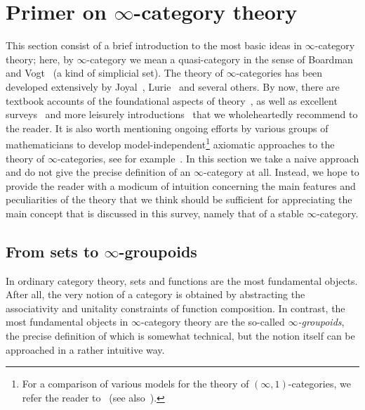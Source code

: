 \documentclass[a4paper]{amsart}
\begin{document}
\section{Primer on $\infty$-category theory}
\label{sec:primer}

This section consist of a brief introduction to the most basic ideas in
$\infty$-category theory; here, by $\infty$-category we mean a quasi-category in
the sense of Boardman and Vogt~\cite{BV73} (a kind of simplicial set). The
theory of $\infty$-categories has been developed extensively by
Joyal~\cite{Joy02,Joy08}, Lurie~\cite{Lur09,Lur17} and several others. By now,
there are textbook accounts of the foundational aspects of
theory~\cite{Cis19,Lan21,kerodon}, as well as excellent surveys~\cite{ACam16}
and more leisurely introductions~\cite{Gro20} that we wholeheartedly recommend
to the reader. It is also worth mentioning ongoing efforts by various groups of
mathematicians to develop model-independent\footnote{For a comparison of various
  models for the theory of $(\infty,1)$-categories, we refer the reader
  to~\cite{Ber18} (see also~\cite{Toe05}).} axiomatic approaches to the theory
of $\infty$-categories, see for example~\cite{RV22,CCW}. In this section we take
a naive approach and do not give the precise definition of an $\infty$-category
at all. Instead, we hope to provide the reader with a modicum of intuition
concerning the main features and peculiarities of the theory that we think
should be sufficient for appreciating the main concept that is discussed in this
survey, namely that of a stable $\infty$-category.

\subsection{From sets to $\infty$-groupoids}

In ordinary category theory, sets and functions are the most fundamental
objects. After all, the very notion of a category is obtained by abstracting the
associativity and unitality constraints of function composition. In contrast,
the most fundamental objects in $\infty$-category theory are the so-called
\emph{$\infty$-groupoids}, the precise definition of which is somewhat
technical, but the notion itself can be approached in a rather intuitive way.
\end{document}
